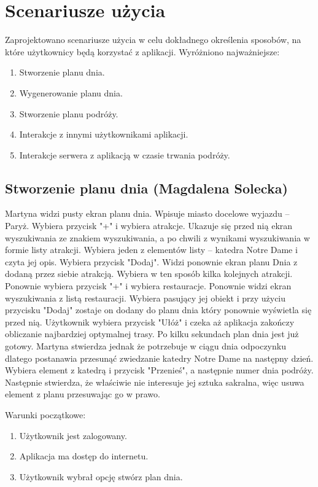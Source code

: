 \documentclass[10pt,twoside,a4paper]{report}
\begin{document}
\section{Scenariusze użycia}
\par Zaprojektowano scenariusze użycia w celu dokładnego określenia sposobów, na które użytkownicy będą korzystać z aplikacji. Wyróżniono najważniejsze:
\begin{enumerate}
  \item Stworzenie planu dnia.
  \item Wygenerowanie planu dnia.
  \item Stworzenie planu podróży.
  \item Interakcje z innymi użytkownikami aplikacji.
  \item Interakcje serwera z aplikacją w czasie trwania podróży.
\end{enumerate}

\subsection{Stworzenie planu dnia (Magdalena Solecka)}
\par Martyna widzi pusty ekran planu dnia. Wpisuje miasto docelowe wyjazdu -- Paryż. Wybiera przycisk "+" i wybiera atrakcje. Ukazuje się przed nią ekran wyszukiwania ze znakiem wyszukiwania, a po chwili z wynikami wyszukiwania w formie listy atrakcji. Wybiera jeden z elementów listy – katedra Notre Dame i czyta jej opis. Wybiera przycisk "Dodaj". Widzi ponownie ekran planu Dnia z dodaną przez siebie atrakcją. Wybiera w ten sposób kilka kolejnych atrakcji. Ponownie wybiera przycisk "+" i wybiera restauracje. Ponownie widzi ekran wyszukiwania z listą restauracji. Wybiera pasujący jej obiekt i przy użyciu przycisku "Dodaj" zostaje on dodany do  planu dnia który ponownie wyświetla się przed nią. Użytkownik wybiera przycisk "Ułóż" i czeka aż aplikacja zakończy obliczanie najbardziej optymalnej trasy. Po kilku sekundach plan dnia jest już gotowy. Martyna stwierdza jednak że potrzebuje w ciągu dnia odpoczynku dlatego postanawia przesunąć zwiedzanie katedry Notre Dame na następny dzień. Wybiera element z katedrą i przycisk "Przenieś", a następnie numer dnia podróży. Następnie stwierdza, że właściwie nie interesuje jej sztuka sakralna, więc usuwa element z planu przesuwając go w prawo.

\noindent\newline Warunki początkowe:
\begin{enumerate}
  \item Użytkownik jest zalogowany.
  \item Aplikacja ma dostęp do internetu.
  \item Użytkownik wybrał opcję stwórz plan dnia.
\end{enumerate}
\end{document}
